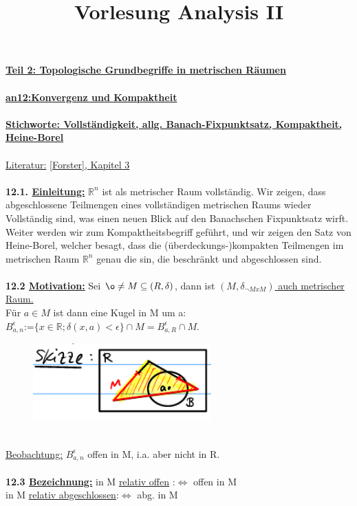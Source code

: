 \documentclass[]{scrartcl}
\title{Vorlesung Analysis II}
\begin{document}
	\textbf{\underline{Teil 2: Topologische Grundbegriffe in metrischen Räumen}}\\
	\\
	\textbf{\underline{an12:Konvergenz und Kompaktheit}}\\
	\\
	\textbf{\underline{\underline{Stichworte:} Vollständigkeit, allg. Banach-Fixpunktsatz, Kompaktheit, Heine-Borel}}\\
	\\
	\underline{Literatur:}  \ul{[Forster], Kapitel 3}\\
	\\
	\textbf{12.1. \underline{Einleitung:}} $\mathbb{R}^n$ ist als metrischer Raum vollständig. Wir zeigen, dass abgeschlossene Teilmengen eines vollständigen metrischen Raums wieder Vollständig sind, was einen neuen Blick auf den Banachschen Fixpunktsatz wirft.
	Weiter werden wir zum Kompaktheitsbegriff geführt, und wir zeigen den Satz von Heine-Borel, welcher besagt, dass die (überdeckungs-)kompakten Teilmengen im metrischen Raum $\mathbb{R}^n$ genau die sin,  die beschränkt und abgeschlossen sind.\\
	\\
	\textbf{12.2 \underline{Motivation:}} Sei $\o \neq M \subseteq (R,\delta)$, dann ist  \ul{$(M,\delta_{\neg MxM})$ auch metrischer Raum.}\\
	Für $a \in M$ ist dann eine Kugel in M um a:\\
	 \ul{$B_{a,n}^\epsilon$}:=$\{x\in\mathbb{R};\delta(x,a)<\epsilon\}\cap M = B_{a,R}^\epsilon\cap M.$\\
	\begin{figure}[h]
		\includegraphics[width=7 cm,height=3cm]{bsp kap 12.2}
	\end{figure}\\
	\underline{Beobachtung:} $B_{a,n}^\epsilon$ offen in M, i.a. aber nicht in R.\\
	\\
	\textbf{12.3 \underline{Bezeichnung:}} in M  \ul{relativ offen} :$\Leftrightarrow$ offen in M\\
	in M \ul{relativ abgeschlossen}:$\Leftrightarrow$ abg. in M\\
\end{document}
